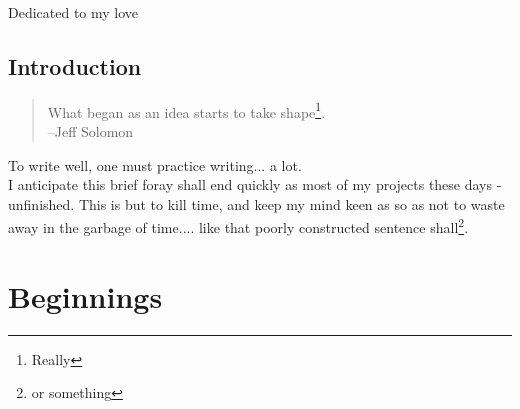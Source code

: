 \documentclass[oneside,11pt]{memoir} %
\begin{document}
\thispagestyle{empty}
\clearpage
\begin{dedication}
Dedicated to my love
\end{dedication}
\newpage

\setcounter{page}{-1}
\clearpage
\tableofcontents*
\thispagestyle{empty}


\chapter{Introduction} %

\begin{quote}
What began as an idea starts to take shape\footnote{Really}.\\
--Jeff Solomon
\end{quote}


To write well, one must practice writing... a lot. \\
I anticipate this brief foray shall end quickly as most of my projects these days - unfinished. This is but to kill time, and keep my mind keen as so as not to waste away in the garbage of time.... like that poorly constructed sentence shall\footnote{or something}. 


\mainmatter
\part{Beginnings}

\end{document}
